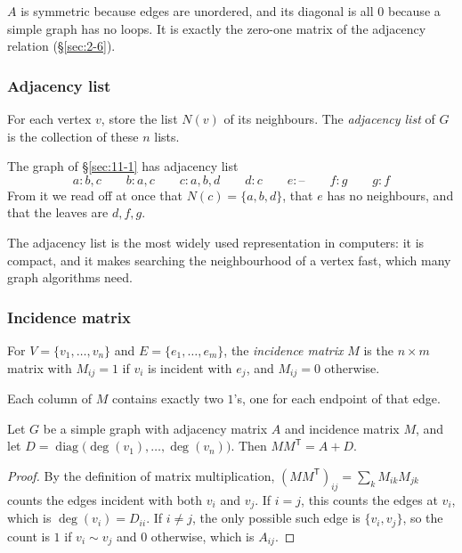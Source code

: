 \begin{note}
$A$ is symmetric because edges are unordered, and its diagonal is all $0$ because a simple graph has no loops. It is exactly the zero-one matrix of the adjacency relation (\S\ref{sec:2-6}).
\end{note}

\subsubsection{Adjacency list}
\begin{definition}
\label{def:adjacency-list}
For each vertex $v$, store the list $N(v)$ of its neighbours. The \emph{adjacency list} of $G$ is the collection of these $n$ lists.
\end{definition}

\begin{example}
The graph of \S\ref{sec:11-1} has adjacency list
\[
a: b,c \qquad b: a,c \qquad c: a,b,d \qquad d: c \qquad e: \text{--} \qquad f: g \qquad g: f
\]
From it we read off at once that $N(c)=\{a,b,d\}$, that $e$ has no neighbours, and that the leaves are $d,f,g$.
\end{example}

\begin{note}
The adjacency list is the most widely used representation in computers: it is compact, and it makes searching the neighbourhood of a vertex fast, which many graph algorithms need.
\end{note}

\subsubsection{Incidence matrix}
\begin{definition}
\label{def:incidence-matrix}
For $V=\{v_1,\dots,v_n\}$ and $E=\{e_1,\dots,e_m\}$, the \emph{incidence matrix} $M$ is the $n\times m$ matrix with $M_{ij}=1$ if $v_i$ is incident with $e_j$, and $M_{ij}=0$ otherwise.
\end{definition}

\begin{note}[Columns]
Each column of $M$ contains exactly two $1$'s, one for each endpoint of that edge.
\end{note}

\begin{proposition}
\label{prop:MMT}
Let $G$ be a simple graph with adjacency matrix $A$ and incidence matrix $M$, and let $D=\operatorname{diag}\bigl(\deg(v_1),\dots,\deg(v_n)\bigr)$. Then $MM^{\mathsf T}=A+D$.
\end{proposition}
\begin{proof}
By the definition of matrix multiplication, $(MM^{\mathsf T})_{ij}=\sum_{k}M_{ik}M_{jk}$ counts the edges incident with both $v_i$ and $v_j$. If $i=j$, this counts the edges at $v_i$, which is $\deg(v_i)=D_{ii}$. If $i\ne j$, the only possible such edge is $\{v_i,v_j\}$, so the count is $1$ if $v_i\sim v_j$ and $0$ otherwise, which is $A_{ij}$.
\end{proof}

